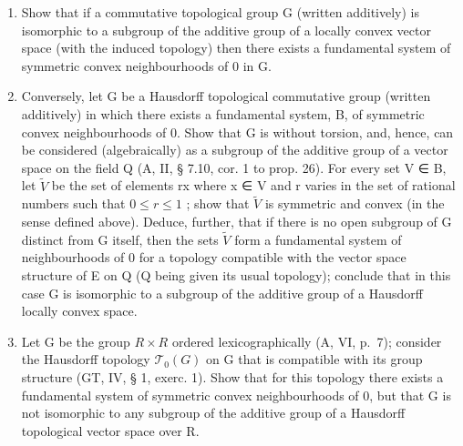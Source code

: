 \begin{enumerate}
\def\labelenumi{\alph{enumi})}
\item
  Show that if a commutative topological group G (written additively) is isomorphic to a subgroup of the additive group of a locally convex vector space (with the induced topology) then there exists a fundamental system of symmetric convex neighbourhoods of 0 in G.
\item
  Conversely, let G be a Hausdorff topological commutative group (written additively) in which there exists a fundamental system, B, of symmetric convex neighbourhoods of 0. Show that G is without torsion, and, hence, can be considered (algebraically) as a subgroup of the additive group of a vector space on the field Q (A, II, § 7.10, cor. 1 to prop. 26). For every set V ∈ B, let \(\tilde{V}\) be the set of elements rx where x ∈ V and r varies in the set of rational numbers such that \(0 \leqslant r \leqslant 1\) ; show that \(\tilde{V}\) is symmetric and convex (in the sense defined above). Deduce, further, that if there is no open subgroup of G distinct from G itself, then the sets \(\tilde{V}\) form a fundamental system of neighbourhoods of 0 for a topology compatible with the vector space structure of E on Q (Q being given its usual topology); conclude that in this case G is isomorphic to a subgroup of the additive group of a Hausdorff locally convex space.
\item
  Let G be the group \(R \times R\) ordered lexicographically (A, VI, p.~7); consider the Hausdorff topology \(\mathcal{T}_{0}(G)\) on G that is compatible with its group structure (GT, IV, § 1, exerc. 1). Show that for this topology there exists a fundamental system of symmetric convex neighbourhoods of 0, but that G is not isomorphic to any subgroup of the additive group of a Hausdorff topological vector space over R.
\end{enumerate}

